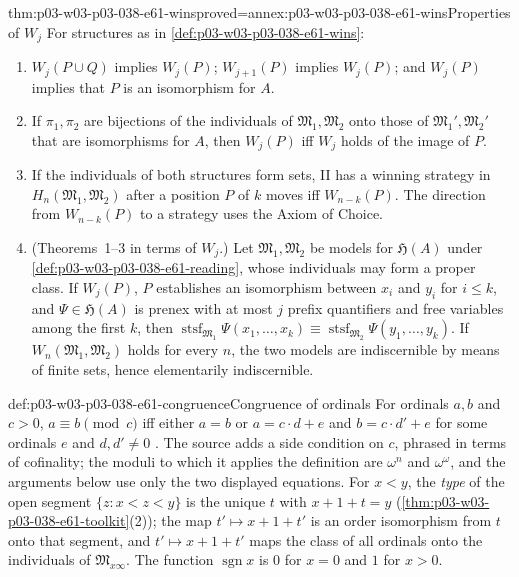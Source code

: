 \begin{hblemma}{thm:p03-w03-p03-038-e61-wins}{proved=annex:p03-w03-p03-038-e61-wins}{Properties of \(W_j\)}
For structures as in \cref{def:p03-w03-p03-038-e61-wins}:
\begin{enumerate}
\item \(W_j(P\cup Q)\) implies \(W_j(P)\); \(W_{j+1}(P)\) implies
      \(W_j(P)\); and \(W_j(P)\) implies that \(P\) is an isomorphism for
      \(A\).
\item If \(\pi_1,\pi_2\) are bijections of the individuals of
      \(\mathfrak M_1,\mathfrak M_2\) onto those of
      \(\mathfrak M_1',\mathfrak M_2'\) that are isomorphisms for \(A\),
      then \(W_j(P)\) iff \(W_j\) holds of the image of \(P\).
\item If the individuals of both structures form sets, II has a winning
      strategy in \(H_n(\mathfrak M_1,\mathfrak M_2)\) after a position
      \(P\) of \(k\) moves iff \(W_{n-k}(P)\). The direction from
      \(W_{n-k}(P)\) to a strategy uses the Axiom of Choice.
\item (Theorems~1--3 in terms of \(W_j\).) Let \(\mathfrak M_1,
      \mathfrak M_2\) be models for \(\mathfrak H(A)\) under
      \cref{def:p03-w03-p03-038-e61-reading}, whose individuals may form
      a proper class. If \(W_j(P)\), \(P\) establishes an isomorphism
      between \(x_i\) and \(y_i\) for \(i\le k\), and
      \(\Psi\in\mathfrak H(A)\) is prenex with at most \(j\) prefix
      quantifiers and free variables among the first \(k\), then
      \(\operatorname{stsf}_{\mathfrak M_1}\Psi(x_1,\ldots,x_k)\equiv
      \operatorname{stsf}_{\mathfrak M_2}\Psi(y_1,\ldots,y_k)\). If
      \(W_n(\mathfrak M_1,\mathfrak M_2)\) holds for every \(n\), the two
      models are indiscernible by means of finite sets, hence elementarily
      indiscernible.
\end{enumerate}
\end{hblemma}

\begin{hbdefinition}{def:p03-w03-p03-038-e61-congruence}{Congruence of ordinals}
For ordinals \(a,b\) and \(c>0\), \(a\equiv b\pmod c\) iff either \(a=b\)
or \(a=c\cdot d+e\) and \(b=c\cdot d'+e\) for some ordinals \(e\) and
\(d,d'\ne0\) \cite[p.~138]{Ehrenfeucht1961}. The source adds a side
condition on \(c\), phrased in terms of cofinality; the moduli to which it
applies the definition are \(\omega^n\) and \(\omega^\omega\), and the
arguments below use only the two displayed equations. For \(x<y\), the
\emph{type} of the open segment \(\{z:x<z<y\}\) is the unique \(t\) with
\(x+1+t=y\) (\cref{thm:p03-w03-p03-038-e61-toolkit}(2)); the map
\(t'\mapsto x+1+t'\) is an order isomorphism from \(t\) onto that
segment, and \(t'\mapsto x+1+t'\) maps the class of all ordinals onto the
individuals of \(\mathfrak M_{x\infty}\). The function
\(\operatorname{sgn}x\) is \(0\) for \(x=0\) and \(1\) for \(x>0\).
\end{hbdefinition}

